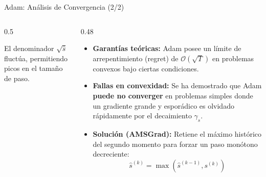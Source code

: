 \begin{frame}{Adam: Análisis de Convergencia (2/2)}
\begin{columns}[T]
\begin{column}{0.5\textwidth}
            \vspace{0.5em}
            {\tiny El denominador $\sqrt{\hat{s}}$ fluctúa, permitiendo picos en el tamaño de paso.\par}
        \end{column}
        \begin{column}{0.48\textwidth}
            \scriptsize
            \begin{itemize}
                \item \textbf{Garantías teóricas:} Adam posee un límite de arrepentimiento (regret) de $\mathcal{O}(\sqrt{T})$ en problemas convexos bajo ciertas condiciones.
                \item \textbf{Fallas en convexidad:} Se ha demostrado que Adam \textbf{puede no converger} en problemas simples donde un gradiente grande y esporádico es olvidado rápidamente por el decaimiento $\gamma_s$.
                \item \textbf{Solución (AMSGrad):} Retiene el máximo histórico del segundo momento para forzar un paso monótono decreciente:
                \[ \hat{s}^{(k)} = \max(\hat{s}^{(k-1)}, s^{(k)}) \]
            \end{itemize}
        \end{column}
    \end{columns}
\end{frame}